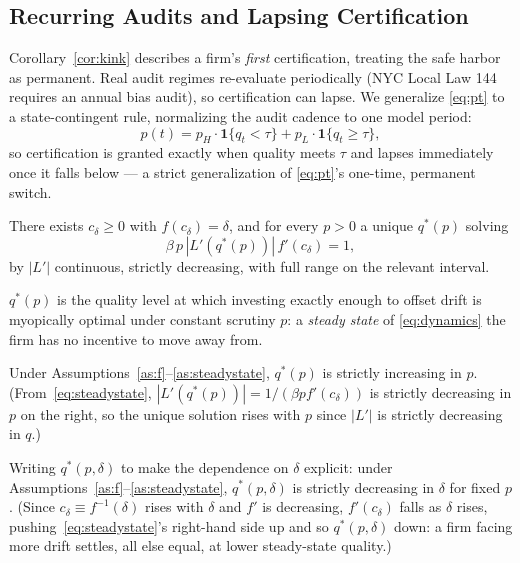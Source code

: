 \subsection{Recurring Audits and Lapsing Certification}
\label{sec:recurring}

Corollary~\ref{cor:kink} describes a firm's \emph{first} certification, treating the safe harbor as permanent. Real audit regimes re-evaluate periodically (NYC Local Law 144~\cite{nyc2021ll144} requires an annual bias audit), so certification can lapse. We generalize \eqref{eq:pt} to a state-contingent rule, normalizing the audit cadence to one model period:
\begin{equation}
p(t) = p_H \cdot \mathbf{1}\{q_t < \tau\} + p_L \cdot \mathbf{1}\{q_t \geq \tau\},
\label{eq:pt-recurring}
\end{equation}
so certification is granted exactly when quality meets $\tau$ and lapses immediately once it falls below — a strict generalization of \eqref{eq:pt}'s one-time, permanent switch.

\begin{assumption}
\label{as:steadystate}
There exists $c_\delta \geq 0$ with $f(c_\delta) = \delta$, and for every $p > 0$ a unique $q^*(p)$ solving
\begin{equation}
\beta\, p\, |L'(q^*(p))|\, f'(c_\delta) = 1,
\label{eq:steadystate}
\end{equation}
by $|L'|$ continuous, strictly decreasing, with full range on the relevant interval.
\end{assumption}

$q^*(p)$ is the quality level at which investing exactly enough to offset drift is myopically optimal under constant scrutiny $p$: a \emph{steady state} of \eqref{eq:dynamics} the firm has no incentive to move away from.

\begin{proposition}
Under Assumptions~\ref{as:f}--\ref{as:steadystate}, $q^*(p)$ is strictly increasing in $p$. (From~\eqref{eq:steadystate}, $|L'(q^*(p))|=1/(\beta p f'(c_\delta))$ is strictly decreasing in $p$ on the right, so the unique solution rises with $p$ since $|L'|$ is strictly decreasing in $q$.)
\label{prop:steadystate}
\end{proposition}

\begin{corollary}
\label{cor:deltacompstat}
Writing $q^*(p,\delta)$ to make the dependence on $\delta$ explicit: under Assumptions~\ref{as:f}--\ref{as:steadystate}, $q^*(p,\delta)$ is strictly decreasing in $\delta$ for fixed $p$. (Since $c_\delta\equiv f^{-1}(\delta)$ rises with $\delta$ and $f'$ is decreasing, $f'(c_\delta)$ falls as $\delta$ rises, pushing~\eqref{eq:steadystate}'s right-hand side up and so $q^*(p,\delta)$ down: a firm facing more drift settles, all else equal, at lower steady-state quality.)
\end{corollary}

